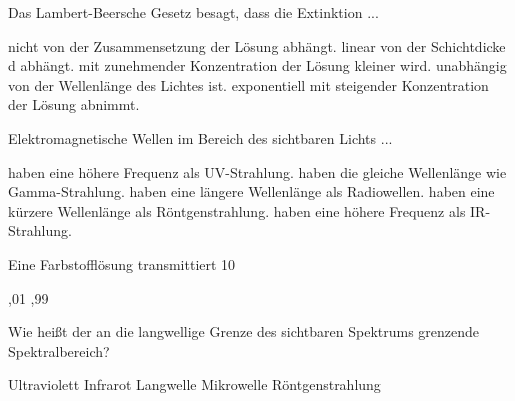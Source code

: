 \documentclass[11pt]{exam}
\begin{document}
\setlength{\voffset}{-0.5in}
\setlength{\headsep}{5pt}

\hspace{2mm}
 \hspace{5mm}
\vspace{4mm}

\begin{questions}

\question Das Lambert-Beersche Gesetz besagt, dass die Extinktion ...

\begin{choices}
	\choice nicht von der Zusammensetzung der Lösung abhängt.
	\choice linear von der Schichtdicke d abhängt.
	\choice mit zunehmender Konzentration der Lösung kleiner wird.
	\choice unabhängig von der Wellenlänge des Lichtes ist.
	\choice exponentiell mit steigender Konzentration der Lösung abnimmt.
\end{choices}

\vspace{3mm}\question Elektromagnetische Wellen im Bereich des sichtbaren Lichts ...

\begin{choices}
	\choice haben eine höhere Frequenz als UV-Strahlung.
	\choice haben die gleiche Wellenlänge wie Gamma-Strahlung.
	\choice haben eine längere Wellenlänge als Radiowellen.
	\choice haben eine kürzere Wellenlänge als Röntgenstrahlung.
	\choice haben eine höhere Frequenz als IR-Strahlung.
\end{choices}

\vspace{3mm}\question Eine Farbstofflösung transmittiert 10 %

\begin{choices}
	,01
	,99
\end{choices}

\vspace{3mm}\question Wie heißt der an die langwellige Grenze des sichtbaren Spektrums grenzende Spektralbereich?

\begin{choices}
	\choice Ultraviolett
	\choice Infrarot
	\choice Langwelle
	\choice Mikrowelle
	\choice Röntgenstrahlung
\end{choices}


\end{questions}
\end{document}

